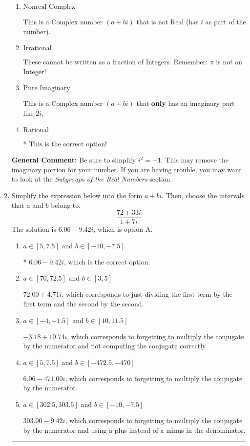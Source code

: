 \documentclass{extbook}[14pt]
\newcommand{\litem}[1]{\item #1

\rule{\textwidth}{0.4pt}}
\begin{document}
\begin{enumerate}
{\begin{enumerate}[label=\Alph*.]
This is not a number. The only non-Complex number we know is dividing by 0 as this is not a number!
\item \( \text{Nonreal Complex} \)

This is a Complex number $(a+bi)$ that is not Real (has $i$ as part of the number).
\item \( \text{Irrational} \)

These cannot be written as a fraction of Integers. Remember: $\pi$ is not an Integer!
\item \( \text{Pure Imaginary} \)

This is a Complex number $(a+bi)$ that \textbf{only} has an imaginary part like $2i$.
\item \( \text{Rational} \)

* This is the correct option!
\end{enumerate}

\textbf{General Comment:} Be sure to simplify $i^2 = -1$. This may remove the imaginary portion for your number. If you are having trouble, you may want to look at the \textit{Subgroups of the Real Numbers} section.
}
\litem{
Simplify the expression below into the form $a+bi$. Then, choose the intervals that $a$ and $b$ belong to.
\[ \frac{72 + 33 i}{1 + 7 i} \]The solution is \( 6.06  - 9.42 i \), which is option A.\begin{enumerate}[label=\Alph*.]
\item \( a \in [5, 7.5] \text{ and } b \in [-10, -7.5] \)

* $6.06  - 9.42 i$, which is the correct option.
\item \( a \in [70, 72.5] \text{ and } b \in [3, 5] \)

 $72.00  + 4.71 i$, which corresponds to just dividing the first term by the first term and the second by the second.
\item \( a \in [-4, -1.5] \text{ and } b \in [10, 11.5] \)

 $-3.18  + 10.74 i$, which corresponds to forgetting to multiply the conjugate by the numerator and not computing the conjugate correctly.
\item \( a \in [5, 7.5] \text{ and } b \in [-472.5, -470] \)

 $6.06  - 471.00 i$, which corresponds to forgetting to multiply the conjugate by the numerator.
\item \( a \in [302.5, 303.5] \text{ and } b \in [-10, -7.5] \)

 $303.00  - 9.42 i$, which corresponds to forgetting to multiply the conjugate by the numerator and using a plus instead of a minus in the denominator.
\end{enumerate}

}
\end{enumerate}
\end{document}
